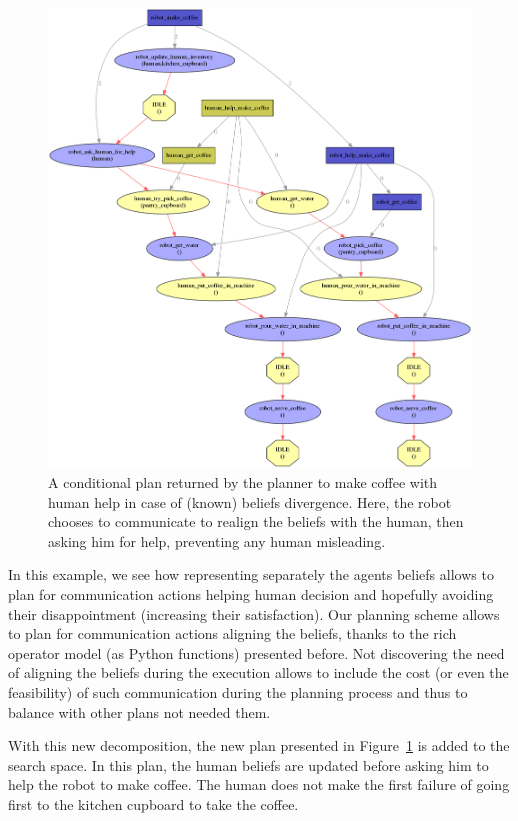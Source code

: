 \documentclass[a4paper,11pt,twoside]{StyleThese}
\begin{document}
\begin{figure}[hbtp]
\centering
\includegraphics[width=\textwidth]{figures/chapter4/Chap4CoopRealign.png}
\caption{A conditional plan returned by the planner to make coffee with human help in case of (known) beliefs divergence. Here, the robot chooses to communicate to realign the beliefs with the human, then asking him for help, preventing any human misleading.}
\label{fig:chap4beliefsdivwithalign}
\end{figure}

In this example, we see how representing separately the agents beliefs allows to plan for communication actions helping human decision and hopefully avoiding their disappointment (increasing their satisfaction). Our planning scheme allows to plan for communication actions aligning the beliefs, thanks to the rich operator model (as Python functions) presented before. Not discovering the need of aligning the beliefs during the execution allows to include the cost (or even the feasibility) of such communication during the planning process and thus to balance with other plans not needed them.

With this new decomposition, the new plan presented in Figure~\ref{fig:chap4beliefsdivwithalign} is added to the search space. In this plan, the human beliefs are updated before asking him to help the robot to make coffee. The human does not make the first failure of going first to the kitchen cupboard to take the coffee.
\end{document}

